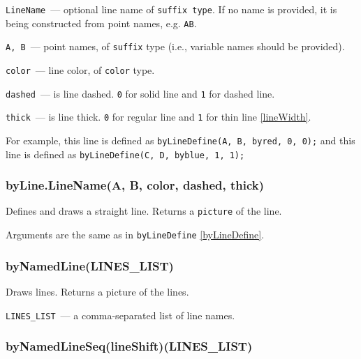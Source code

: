 	\texttt{LineName}~— optional line name of \texttt{suffix type}. If no name is provided, it is being constructed from point names, e.g. \texttt{AB}.
	
	\texttt{A, B}~— point names, of \texttt{suffix} type (i.e., variable names should be provided).
	
	\texttt{color}~— line color, of \texttt{color} type.
	
	\texttt{dashed}~— is line dashed. \texttt{0} for solid line and \texttt{1} for dashed line.
	
	\texttt{thick}~— is line thick. \texttt{0} for regular line and \texttt{1} for thin line \ref{lineWidth}.

	For example, this line  is defined as \texttt{byLineDefine(A, B, byred, 0, 0);} and this line  is defined as \texttt{byLineDefine(C, D, byblue, 1, 1);}


\subsubsection{byLine.LineName(A, B, color, dashed, thick)}\label{byLine}

	Defines and draws a straight line. Returns a \texttt{picture} of the line.
	
	Arguments are the same as in \texttt{byLineDefine} \ref{byLineDefine}.


\subsubsection{byNamedLine(LINES\_LIST)}\label{byNamedLine}

	Draws lines. Returns a picture of the lines.
	
	\texttt{LINES\_LIST}~— a comma-separated list of line names.

\subsubsection{byNamedLineSeq(lineShift)(LINES\_LIST)}\label{byNamedLineSeq}

		

